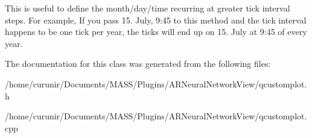 This is useful to define the month/day/time recurring at greater tick interval steps. For example, If you pass 15. July, 9\+:45 to this method and the tick interval happens to be one tick per year, the ticks will end up on 15. July at 9\+:45 of every year. 

The documentation for this class was generated from the following files\+:\begin{DoxyCompactItemize}
\item 
/home/curunir/\+Documents/\+M\+A\+S\+S/\+Plugins/\+A\+R\+Neural\+Network\+View/qcustomplot.\+h\item 
/home/curunir/\+Documents/\+M\+A\+S\+S/\+Plugins/\+A\+R\+Neural\+Network\+View/qcustomplot.\+cpp\end{DoxyCompactItemize}
